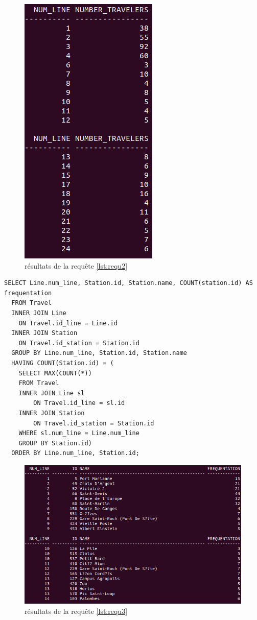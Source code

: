 \documentclass[a4paper,12pt]{report}
\begin{document}
\begin{figure}[!ht]
  \centering
  \includegraphics[scale=0.5]{images/requetes_analytiques/requ2.png}
  \caption{résultats de la requête \ref{lst:requ2}}
\end{figure}

\newpage

\begin{lstlisting}[caption={l'arrêt le plus fréquenté par ligne}, label={lst:requ3}]
  SELECT Line.num_line, Station.id, Station.name, COUNT(station.id) AS frequentation
  FROM Travel
  INNER JOIN Line
  	ON Travel.id_line = Line.id
  INNER JOIN Station
  	ON Travel.id_station = Station.id
  GROUP BY Line.num_line, Station.id, Station.name
  HAVING COUNT(Station.id) = (
    SELECT MAX(COUNT(*))
  	FROM Travel
  	INNER JOIN Line sl
  		ON Travel.id_line = sl.id
  	INNER JOIN Station
  		ON Travel.id_station = Station.id
  	WHERE sl.num_line = Line.num_line
  	GROUP BY Station.id)
  ORDER BY Line.num_line, Station.id;
\end{lstlisting}

\begin{figure}[!ht]
  \centering
  \includegraphics[scale=0.5]{images/requetes_analytiques/requ3.png}
  \caption{résultats de la requête \ref{lst:requ3}}
\end{figure}
\end{document}
